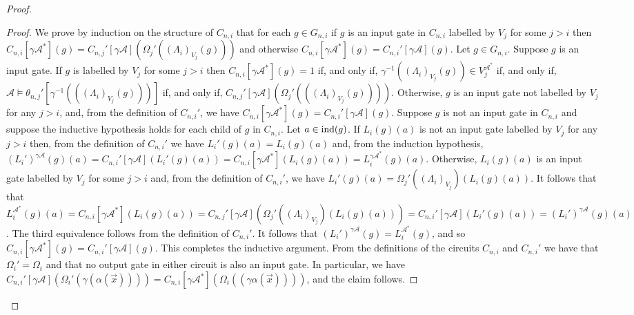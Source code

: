\documentclass[../main/thesis.tex]{subfiles}
\begin{document}
\begin{proof}
\begin{proof}
  We prove by induction on the structure of $C_{n, i}$ that for each $g \in
  G_{n, i}$ if $g$ is an input gate in $C_{n, i}$ labelled by $V_j$ for some $j
  > i$ then $C_{n, i}[\gamma \mathcal{A}^*](g) = C_{n, j}'[\gamma
  \mathcal{A}](\Omega_j'((\Lambda_i)_{V_j}(g)))$ and otherwise $C_{n, i}[\gamma
  \mathcal{A}^*](g) = C_{n, i}'[\gamma \mathcal{A}](g)$. Let $g \in G_{n, i}$.
  Suppose $g$ is an input gate. If $g$ is labelled by $V_j$ for some $j > i$
  then $C_{n, i}[\gamma \mathcal{A}^*](g) = 1$ if, and only if, $\gamma^{-1}
  ((\Lambda_i)_{V_j}(g)) \in V^{\mathcal{A}^*}_j$ if, and only if, $\mathcal{A}
  \models \theta_{n, j}'[\gamma^{-1} (((\Lambda_i)_{V_j}(g)))]$ if, and only if,
  $C_{n, j}'[\gamma \mathcal{A}](\Omega_j'(((\Lambda_i)_{V_j}(g))))$. Otherwise,
  $g$ is an input gate not labelled by $V_j$ for any $j > i$, and, from the
  definition of $C_{n, i}'$, we have $C_{n, i}[\gamma \mathcal{A}^*](g) = C_{n,
    i}' [\gamma \mathcal{A}](g)$. Suppose $g$ is not an input gate in $C_{n, i}$
  and suppose the inductive hypothesis holds for each child of $g$ in $C_{n,
    i}$. Let $a \in \text{\upshape ind}(g)$. If $L_i(g)(a)$ is not an input gate labelled by
  $V_j$ for any $j > i$ then, from the definition of $C_{n, i}'$ we have $L_i'
  (g) (a) = L_i (g)(a)$ and, from the induction hypothesis, $(L_i')^{\gamma
    \mathcal{A}}(g)(a) = C_{n, i}' [\gamma \mathcal{A}](L_i'(g)(a)) = C_{n,
    i}[\gamma \mathcal{A}^*](L_i(g)(a)) = L^{\gamma \mathcal{A}^*}_i(g)(a)$.
  Otherwise, $L_i(g)(a)$ is an input gate labelled by $V_j$ for some $j > i$
  and, from the definition of $C_{n, i}'$, we have $L_i'(g)(a) =
  \Omega_j'((\Lambda_i)_{V_j})(L_i(g)(a))$. It follows that that
  $L^{\mathcal{A}^*}_i(g)(a) = C_{n, i}[\gamma \mathcal{A}^*](L_i(g)(a)) = C_{n,
    j}'[\gamma \mathcal{A}](\Omega_j'((\Lambda_i)_{V_j})(L_i(g)(a))) = C_{n,
    i}'[\gamma \mathcal{A}](L_i'(g)(a)) = (L_i')^{\gamma \mathcal{A}}(g)(a)$.
  The third equivalence follows from the definition of $C_{n, i}'$. It follows
  that $(L_i')^{\gamma \mathcal{A}}(g) = L^{\mathcal{A}^*}_i(g)$, and so $C_{n,
    i}[\gamma \mathcal{A}^*](g) = C_{n, i}'[\gamma \mathcal{A}](g)$. This
  completes the inductive argument. From the definitions of the circuits $C_{n,
    i}$ and $C_{n, i}'$ we have that $\Omega_i' = \Omega_i$ and that no output
  gate in either circuit is also an input gate. In particular, we have $C_{n,
    i}'[\gamma \mathcal{A}](\Omega_i' (\gamma (\alpha (\vec{x})))) = C_{n,
    i}[\gamma \mathcal{A}^*](\Omega_i ((\gamma \alpha (\vec{x}))))$, and the
  claim follows.


\end{proof}
\end{proof}
\end{document}
